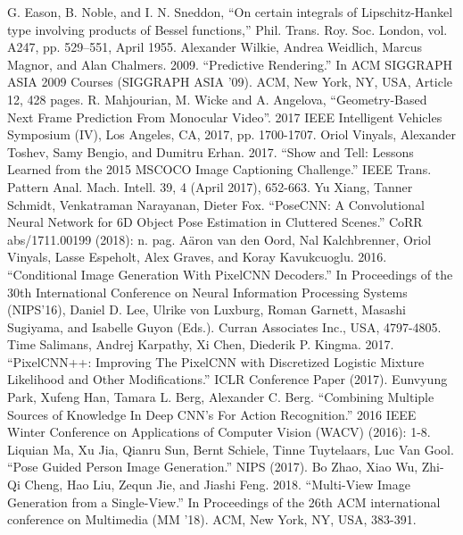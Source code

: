 \documentclass[conference]{IEEEtran}
\begin{document}

\begin{thebibliography}{12}
 G. Eason, B. Noble, and I. N. Sneddon, ``On certain integrals of Lipschitz-Hankel type involving products of Bessel functions,'' Phil. Trans. Roy. Soc. London, vol. A247, pp. 529--551, April 1955.
 Alexander Wilkie, Andrea Weidlich, Marcus Magnor, and Alan Chalmers. 2009. ``Predictive Rendering.'' In ACM SIGGRAPH ASIA 2009 Courses (SIGGRAPH ASIA '09). ACM, New York, NY, USA, Article 12, 428 pages.
 R. Mahjourian, M. Wicke and A. Angelova, ``Geometry-Based Next Frame Prediction From Monocular Video''. 2017 IEEE Intelligent Vehicles Symposium (IV), Los Angeles, CA, 2017, pp. 1700-1707.
 Oriol Vinyals, Alexander Toshev, Samy Bengio, and Dumitru Erhan. 2017. ``Show and Tell: Lessons Learned from the 2015 MSCOCO Image Captioning Challenge.'' IEEE Trans. Pattern Anal. Mach. Intell. 39, 4 (April 2017), 652-663.
 Yu Xiang, Tanner Schmidt, Venkatraman Narayanan, Dieter Fox. ``PoseCNN: A Convolutional Neural Network for 6D Object Pose Estimation in Cluttered Scenes.'' CoRR abs/1711.00199 (2018): n. pag.
 A\"{a}ron van den Oord, Nal Kalchbrenner, Oriol Vinyals, Lasse Espeholt, Alex Graves, and Koray Kavukcuoglu. 2016. ``Conditional Image Generation With PixelCNN Decoders.'' In Proceedings of the 30th International Conference on Neural Information Processing Systems (NIPS'16), Daniel D. Lee, Ulrike von Luxburg, Roman Garnett, Masashi Sugiyama, and Isabelle Guyon (Eds.). Curran Associates Inc., USA, 4797-4805.
 Time Salimans, Andrej Karpathy, Xi Chen, Diederik P. Kingma. 2017. ``PixelCNN++: Improving The PixelCNN with Discretized Logistic Mixture Likelihood and Other Modifications.'' ICLR Conference Paper (2017).
 Eunvyung Park, Xufeng Han, Tamara L. Berg, Alexander C. Berg. ``Combining Multiple Sources of Knowledge In Deep CNN's For Action Recognition.'' 2016 IEEE Winter Conference on Applications of Computer Vision (WACV) (2016): 1-8.
 Liquian Ma, Xu Jia, Qianru Sun, Bernt Schiele, Tinne Tuytelaars, Luc Van Gool. ``Pose Guided Person Image Generation.'' NIPS (2017).
 Bo Zhao, Xiao Wu, Zhi-Qi Cheng, Hao Liu, Zequn Jie, and Jiashi Feng. 2018. ``Multi-View Image Generation from a Single-View.'' In Proceedings of the 26th ACM international conference on Multimedia (MM '18). ACM, New York, NY, USA, 383-391.

\end{thebibliography}
\end{document}

